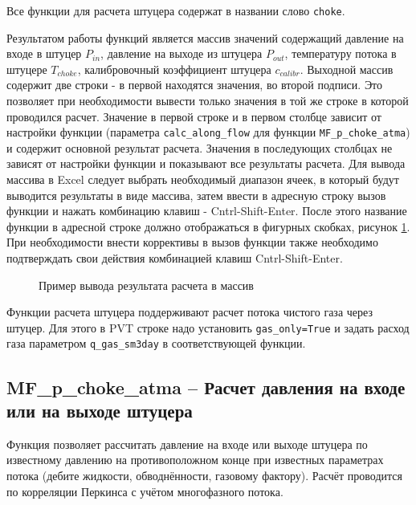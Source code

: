 Все функции для расчета штуцера содержат в названии слово \texttt{choke}. 
 
Результатом работы функций является массив значений содержащий давление на входе в штуцер $P_{in}$, давление на выходе из штуцера $P_{out}$, температуру потока в штуцере $T_{choke}$, калибровочный коэффициент штуцера $c_{calibr}$.  Выходной массив содержит две строки - в первой находятся значения, во второй подписи. Это позволяет при необходимости вывести только значения в той же строке в которой проводился расчет. Значение в первой строке и в первом столбце зависит от настройки функции (параметра \texttt{calc_along_flow} для функции \texttt{MF_p_choke_atma}) и содержит основной результат расчета. Значения в последующих столбцах не зависят от настройки функции и показывают все результаты расчета.
Для вывода массива в Excel следует выбрать необходимый диапазон ячеек, в который будут выводится результаты в виде массива, затем ввести в адресную строку вызов функции и нажать комбинацию клавиш - Cntrl-Shift-Enter. После этого название функции в адресной строке должно отображаться в фигурных скобках, рисунок \ref{ris:choke_array_out}. При необходимости внести коррективы в вызов функции также необходимо подтверждать свои действия комбинацией клавиш Cntrl-Shift-Enter.


\begin{figure}[ht]
	\caption{Пример вывода результата расчета в массив}
	\label{ris:choke_array_out}
\end{figure}

Функции расчета штуцера поддерживают расчет потока чистого газа через штуцер. Для этого в PVT строке надо установить \texttt{gas_only=True} и задать расход газа параметром \texttt{q_gas_sm3day} в соответствующей функции. 

\subsection{MF\_p\_choke\_atma – Расчет давления на входе или на выходе штуцера}
Функция позволяет рассчитать давление на входе или выходе штуцера по известному давлению на противоположном конце при известных параметрах потока (дебите жидкости, обводнённости, газовому фактору). Расчёт проводится по корреляции Перкинса \cite{Perkins_1993} с учётом многофазного потока. 
 

